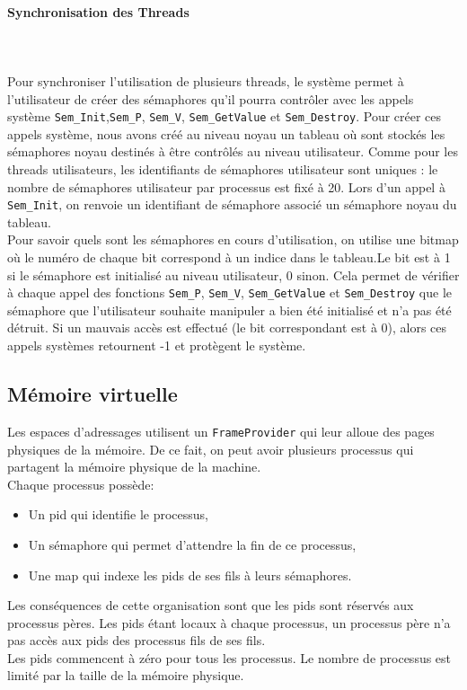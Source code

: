 \documentclass{report}
\newcommand{\myparagraph}[1]{\paragraph*{#1}\mbox{}\\}
\begin{document}
\myparagraph{Synchronisation des Threads}\\
Pour synchroniser l'utilisation de plusieurs threads, le système permet à l'utilisateur de créer des sémaphores qu'il pourra contrôler avec les appels système \texttt{Sem\_Init},\texttt{Sem\_P}, \texttt{Sem\_V}, \texttt{Sem\_GetValue} et \texttt{Sem\_Destroy}. Pour créer ces appels système, nous avons créé au niveau noyau un tableau où sont stockés les sémaphores noyau destinés à être contrôlés au niveau utilisateur. Comme pour les threads utilisateurs, les identifiants de sémaphores utilisateur sont uniques : le nombre de sémaphores utilisateur par processus est fixé à 20. Lors d'un appel à \texttt{Sem\_Init}, on renvoie un identifiant de sémaphore associé un sémaphore noyau du tableau. \\

Pour savoir quels sont les sémaphores en cours d'utilisation, on utilise une bitmap où le numéro de chaque bit correspond à un indice dans le tableau.Le bit est à 1 si le sémaphore est initialisé au niveau utilisateur, 0 sinon. Cela permet de vérifier à chaque appel des fonctions \texttt{Sem\_P}, \texttt{Sem\_V}, \texttt{Sem\_GetValue} et \texttt{Sem\_Destroy} que le sémaphore que l'utilisateur souhaite manipuler a bien été initialisé et n'a pas été détruit. Si un mauvais accès est effectué (le bit correspondant est à 0), alors ces appels systèmes retournent -1 et protègent le système.
 
\subsection*{Mémoire virtuelle}
Les espaces d'adressages utilisent un \texttt{FrameProvider} qui leur alloue des pages physiques de la mémoire. De ce fait, on peut avoir plusieurs processus qui partagent la mémoire physique de la machine.\\
Chaque processus possède:
\begin{itemize}
	\item Un pid qui identifie le processus,
	\item Un sémaphore qui permet d'attendre la fin de ce processus,
	\item Une map qui indexe les pids de ses fils à leurs sémaphores.
\end{itemize}
Les conséquences de cette organisation sont que les pids sont réservés aux processus pères. Les pids étant locaux à chaque processus, un processus père n'a pas accès aux pids des processus fils de ses fils.\\
Les pids commencent à zéro pour tous les processus. Le nombre de processus est limité par la taille de la mémoire physique.\\
\end{document}
